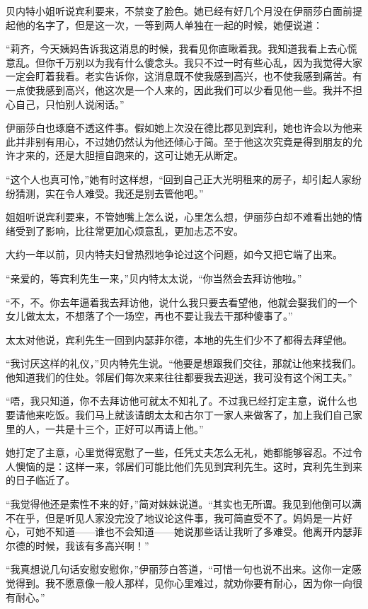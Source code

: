 \par 贝内特小姐听说宾利要来，不禁变了脸色。她已经有好几个月没在伊丽莎白面前提起他的名字了，但是这一次，一等到两人单独在一起的时候，她便说道：
\par “莉齐，今天姨妈告诉我这消息的时候，我看见你直瞅着我。我知道我看上去心慌意乱。但你千万别以为我有什么傻念头。我只不过一时有些心乱，因为我觉得大家一定会盯着我看。老实告诉你，这消息既不使我感到高兴，也不使我感到痛苦。有一点使我感到高兴，他这次是一个人来的，因此我们可以少看见他一些。我并不担心自己，只怕别人说闲话。”
\par 伊丽莎白也琢磨不透这件事。假如她上次没在德比郡见到宾利，她也许会以为他来此并非别有用心，不过她仍然认为他还倾心于简。至于他这次究竟是得到朋友的允许才来的，还是大胆擅自跑来的，这可让她无从断定。
\par “这个人也真可怜，”她有时这样想，“回到自己正大光明租来的房子，却引起人家纷纷猜测，实在令人难受。我还是别去管他吧。”
\par 姐姐听说宾利要来，不管她嘴上怎么说，心里怎么想，伊丽莎白却不难看出她的情绪受到了影响，比往常更加心烦意乱，更加忐忑不安。
\par 大约一年以前，贝内特夫妇曾热烈地争论过这个问题，如今又把它端了出来。
\par “亲爱的，等宾利先生一来，”贝内特太太说，“你当然会去拜访他啦。”
\par “不，不。你去年逼着我去拜访他，说什么我只要去看望他，他就会娶我们的一个女儿做太太，不想落了个一场空，再也不要让我去干那种傻事了。”
\par 太太对他说，宾利先生一回到内瑟菲尔德，本地的先生们少不了都得去拜望他。
\par “我讨厌这样的礼仪，”贝内特先生说。“他要是想跟我们交往，那就让他来找我们。他知道我们的住处。邻居们每次来来往往都要我去迎送，我可没有这个闲工夫。”
\par “唔，我只知道，你不去拜访他可就太不知礼了。不过我已经打定主意，说什么也要请他来吃饭。我们马上就该请朗太太和古尔丁一家人来做客了，加上我们自己家里的人，一共是十三个，正好可以再请上他。”
\par 她打定了主意，心里觉得宽慰了一些，任凭丈夫怎么无礼，她都能够容忍。不过令人懊恼的是：这样一来，邻居们可能比他们先见到宾利先生。这时，宾利先生到来的日子临近了。
\par “我觉得他还是索性不来的好，”简对妹妹说道。“其实也无所谓。我见到他倒可以满不在乎，但是听见人家没完没了地议论这件事，我可简直受不了。妈妈是一片好心，可她不知道——谁也不会知道——她说那些话让我听了多难受。他离开内瑟菲尔德的时候，我该有多高兴啊！”
\par “我真想说几句话安慰安慰你，”伊丽莎白答道，“可惜一句也说不出来。这你一定感觉得到。我不愿意像一般人那样，见你心里难过，就劝你要有耐心，因为你一向很有耐心。”

